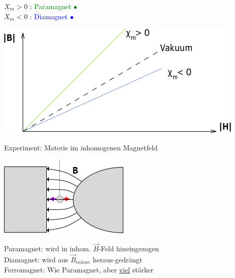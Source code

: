 \begin{center}
	$ X_m > 0 $ \hspace{5mm} : \textcolor{green}{Paramagnet $ \bullet $}\\
	$ X_m < 0 $ \hspace{5mm} : \textcolor{blue}{Diamagnet $ \bullet $}
\end{center}
\begin{center}
	\includegraphics[width=0.5\linewidth]{skizzen/17/17B03}
\end{center}
Experiment: Materie im inhomogenen Magnetfeld
\begin{center}
	\includegraphics[width=0.5\linewidth]{skizzen/17/17B04}
\end{center}
Paramagnet: wird in inhom. $ \vec{B} $-Feld hineingezogen\\
Diamagnet: wird aus $ \vec{B}_{inhom} $ heraus-gedrängt\\
Ferromagnet: Wie Paramagnet, aber \underline{viel} stärker\\
